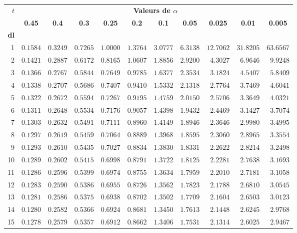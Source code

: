 %
\begin{center}
 \begin{tabular}{r|rrrrrrrrrr}
$t$ & \multicolumn{10}{c}{\bf Valeurs de $\alpha$}\\
&
\multicolumn{1}{c}{\bf 0.45}&
\multicolumn{1}{c}{\bf 0.4}&
\multicolumn{1}{c}{\bf 0.3}&
\multicolumn{1}{c}{\bf 0.25}&
\multicolumn{1}{c}{\bf 0.2}&
\multicolumn{1}{c}{\bf 0.1}&
\multicolumn{1}{c}{\bf 0.05}&
\multicolumn{1}{c}{\bf 0.025}&
\multicolumn{1}{c}{\bf 0.01}&
\multicolumn{1}{c}{\bf 0.005}\\
\hline
{\bf dl} & \\
1&$0.1584$&$0.3249$&$0.7265$&$1.0000$&$1.3764$&$3.0777$&$6.3138$&$12.7062$&$31.8205$&$63.6567$\\
2&$0.1421$&$0.2887$&$0.6172$&$0.8165$&$1.0607$&$1.8856$&$2.9200$&$ 4.3027$&$ 6.9646$&$ 9.9248$\\
3&$0.1366$&$0.2767$&$0.5844$&$0.7649$&$0.9785$&$1.6377$&$2.3534$&$ 3.1824$&$ 4.5407$&$ 5.8409$\\
4&$0.1338$&$0.2707$&$0.5686$&$0.7407$&$0.9410$&$1.5332$&$2.1318$&$ 2.7764$&$ 3.7469$&$ 4.6041$\\
5&$0.1322$&$0.2672$&$0.5594$&$0.7267$&$0.9195$&$1.4759$&$2.0150$&$ 2.5706$&$ 3.3649$&$ 4.0321$\\
6&$0.1311$&$0.2648$&$0.5534$&$0.7176$&$0.9057$&$1.4398$&$1.9432$&$ 2.4469$&$ 3.1427$&$ 3.7074$\\
7&$0.1303$&$0.2632$&$0.5491$&$0.7111$&$0.8960$&$1.4149$&$1.8946$&$ 2.3646$&$ 2.9980$&$ 3.4995$\\
8&$0.1297$&$0.2619$&$0.5459$&$0.7064$&$0.8889$&$1.3968$&$1.8595$&$ 2.3060$&$ 2.8965$&$ 3.3554$\\
9&$0.1293$&$0.2610$&$0.5435$&$0.7027$&$0.8834$&$1.3830$&$1.8331$&$ 2.2622$&$ 2.8214$&$ 3.2498$\\
10&$0.1289$&$0.2602$&$0.5415$&$0.6998$&$0.8791$&$1.3722$&$1.8125$&$ 2.2281$&$ 2.7638$&$ 3.1693$\\
11&$0.1286$&$0.2596$&$0.5399$&$0.6974$&$0.8755$&$1.3634$&$1.7959$&$ 2.2010$&$ 2.7181$&$ 3.1058$\\
12&$0.1283$&$0.2590$&$0.5386$&$0.6955$&$0.8726$&$1.3562$&$1.7823$&$ 2.1788$&$ 2.6810$&$ 3.0545$\\
13&$0.1281$&$0.2586$&$0.5375$&$0.6938$&$0.8702$&$1.3502$&$1.7709$&$ 2.1604$&$ 2.6503$&$ 3.0123$\\
14&$0.1280$&$0.2582$&$0.5366$&$0.6924$&$0.8681$&$1.3450$&$1.7613$&$ 2.1448$&$ 2.6245$&$ 2.9768$\\
15&$0.1278$&$0.2579$&$0.5357$&$0.6912$&$0.8662$&$1.3406$&$1.7531$&$ 2.1314$&$ 2.6025$&$ 2.9467$\\

\end{tabular}
\end{center}
